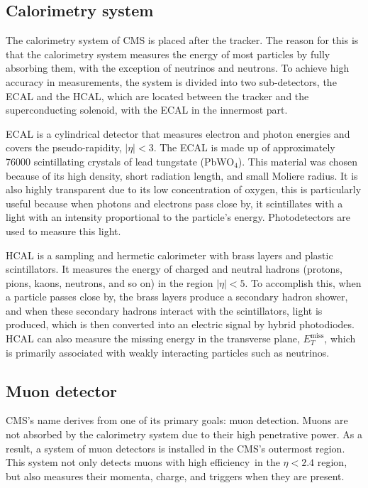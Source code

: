 \subsection{Calorimetry system}
The calorimetry system of CMS is placed after the tracker. The reason for this is that the calorimetry system measures the energy of most particles by fully absorbing them, with the exception of neutrinos and neutrons. To achieve high accuracy in measurements, the system is divided into two sub-detectors, the ECAL and the HCAL, which are located between the tracker and the superconducting solenoid, with the ECAL in the innermost part.

ECAL is a cylindrical detector that measures electron and photon energies and covers the pseudo-rapidity, $|\eta| < 3$. The ECAL is made up of approximately 76000 scintillating crystals of lead tungstate (PbWO$_4$). This material was chosen because of its high density, short radiation length, and small Moliere radius. It is also highly transparent due to its low concentration of oxygen, this is particularly useful because when photons and electrons pass close by, it scintillates with a light with an intensity proportional to the particle's energy. Photodetectors are used to measure this light.

HCAL is a sampling and hermetic calorimeter with brass layers and plastic scintillators. It measures the energy of charged and neutral hadrons (protons, pions, kaons, neutrons, and so on) in the region $|\eta| < 5$. To accomplish this, when a particle passes close by, the brass layers produce a secondary hadron shower, and when these secondary hadrons interact with the scintillators, light is produced, which is then converted into an electric signal by hybrid photodiodes. HCAL can also measure the missing energy in the transverse plane, $E^{\text{miss}}_T$, which is primarily associated with weakly interacting particles such as neutrinos.
\subsection{Muon detector}
CMS's name derives from one of its primary goals: muon detection. Muons are not absorbed by the calorimetry system due to their high penetrative power. As a result, a system of muon detectors is installed in the CMS's outermost region. This system not only detects muons with high efficiency in the $\eta < 2.4$ region, but also measures their momenta, charge, and triggers when they are present.

